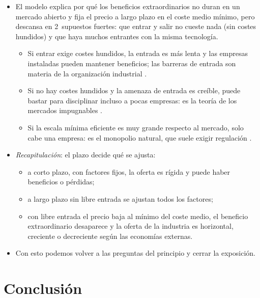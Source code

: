 \documentclass[11pt]{article}
\begin{document}
\begin{itemize}
\item El modelo explica por qué los beneficios extraordinarios no duran en un mercado abierto y fija el precio a largo plazo en el coste medio mínimo, pero descansa en 2~supuestos fuertes: que entrar y salir no cueste nada (sin costes hundidos) y que haya muchos entrantes con la misma tecnología.
  \begin{itemize}
  \item Si entrar exige costes hundidos, la entrada es más lenta y las empresas instaladas pueden mantener beneficios; las barreras de entrada son materia de la organización industrial .
  \item Si no hay costes hundidos y la amenaza de entrada es creíble, puede bastar para disciplinar incluso a pocas empresas: es la teoría de los mercados impugnables .
  \item Si la escala mínima eficiente es muy grande respecto al mercado, solo cabe una empresa: es el monopolio natural, que suele exigir regulación  .
  \end{itemize}
\item \emph{Recapitulación}: el plazo decide qué se ajusta:
  \begin{itemize}
  \item a corto plazo, con factores fijos, la oferta es rígida y puede haber beneficios o pérdidas;
  \item a largo plazo sin libre entrada se ajustan todos los factores;
  \item con libre entrada el precio baja al mínimo del coste medio, el beneficio extraordinario desaparece y la oferta de la industria es horizontal, creciente o decreciente según las economías externas.
  \end{itemize}
\item Con esto podemos volver a las preguntas del principio y cerrar la exposición.
\end{itemize}

\section*{Conclusión}
\end{document}

